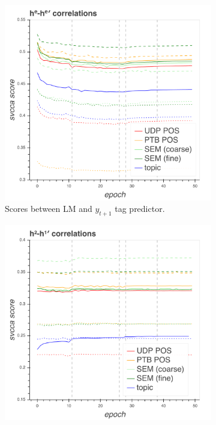 \begin{figure}
\begin{subfigure}{.48\textwidth}
\includegraphics[width=\textwidth]{svcca/cca_output_domain_encoder.png}
\caption{Scores between LM and $y_{t+1}$ tag predictor.}
\label{fig:domain_cca}
\end{subfigure}%
\hfill
\begin{subfigure}{.48\textwidth}
\includegraphics[width=\textwidth]{svcca/cca_input_domain_2.png}

\end{subfigure}
\end{figure}
